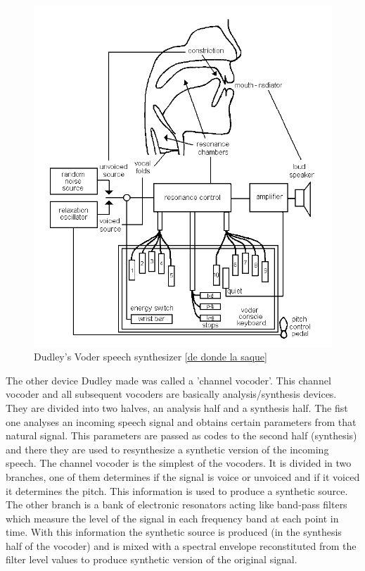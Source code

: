 \begin{figure}[!htb]
	\begin{center}
	\includegraphics[width=1\textwidth]{img/voder.png}
	\end{center}
	\caption{\label{voder}Dudley's Voder speech synthesizer \ref{de donde la saque}}
\end{figure}
The other device Dudley made was called a 'channel vocoder'. This channel vocoder and all subsequent vocoders are basically analysis/synthesis devices. They are divided into two halves, an analysis half and a synthesis half. The fist one analyses an incoming speech signal and obtains certain parameters from that natural signal. This parameters are passed as codes to the second half (synthesis) and there they are used to resynthesize a synthetic version of the incoming speech. The channel vocoder is the simplest of the vocoders. It is divided in two branches, one of them determines if the signal is voice or unvoiced and if it voiced it determines the pitch. This information is used to produce a synthetic source. The other branch is a bank of electronic resonators acting like band-pass filters which measure the level of the signal in each frequency band at each point in time. With this information the synthetic source is produced (in the synthesis half of the vocoder) and is mixed with a spectral envelope reconstituted from the filter level values to produce synthetic version of the original signal.\\
